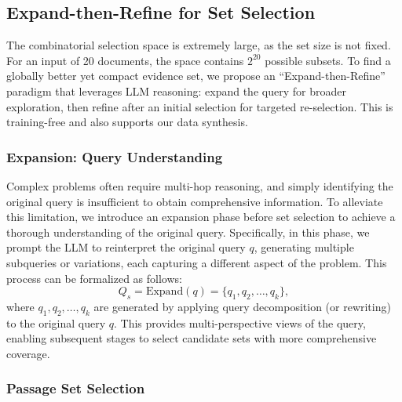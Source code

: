 \documentclass[11pt]{article}
\begin{document}
\subsection{Expand-then-Refine for Set Selection}
The combinatorial selection space is extremely large, as the set size is not fixed. For an input of 20 documents, the space contains $2^{20}$ possible subsets. 
To find a globally better yet compact evidence set, we propose an ``Expand-then-Refine'' paradigm that leverages LLM reasoning: expand the query for broader exploration, then refine after an initial selection for targeted re-selection. This is training-free and also supports our data synthesis.


\subsubsection{Expansion: Query Understanding}
Complex problems often require multi-hop reasoning, and simply identifying the original query is insufficient to obtain comprehensive information. To alleviate this limitation, we introduce an expansion phase before set selection to achieve a thorough understanding of the original query. Specifically, in this phase, we prompt the LLM to reinterpret the original query $q$, generating multiple subqueries or variations, each capturing a different aspect of the problem. This process can be formalized as follows: 
\begin{equation}
\label{eq:Expand}
    Q_s = \text{Expand}(q) =  \{ q_1, q_2, \dots, q_k \}, 
\end{equation}
where \( q_1, q_2, \dots, q_k \) are generated by applying query decomposition (or rewriting) to the original query $q$. This provides multi-perspective views of the query, enabling subsequent stages to select candidate sets with more comprehensive coverage. 


\subsubsection{Passage Set Selection}
\label{sec:selection}
\end{document}
